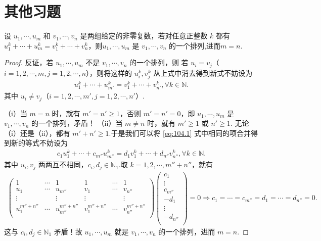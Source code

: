 \documentclass[../../main.tex]{subfiles}%
\begin{document}
\section{其他习题}

\begin{lemma}\label{lemma:引理1564561}
设 $u_1,\cdots,u_m$ 和 $v_1,\cdots,v_n$ 是两组给定的非零复数，若对任意正整数 $k$ 都有 $u_1^k+\cdots+u_m^k=v_1^k+\cdots+v_n^k$，则$u_1,\cdots,u_m$ 是 $v_1,\cdots,v_n$ 的一个排列,进而$m=n$.
\end{lemma}
\begin{proof}
反证，若 $u_1,\cdots ,u_m$ 不是 $v_1,\cdots ,v_n$ 的一个排列，则
若 $u_i=v_j$（$i=1,2,\cdots ,m,j=1,2,\cdots ,n$），则将这样的 $u_{i}^{k},v_{j}^{k}$ 从上式中消去得到新式不妨设为
\begin{align}
u_{1}^{k}+\cdots +u_{m'}^{k}=v_{1}^{k}+\cdots +v_{n'}^{k},\forall k\in \mathbb{N} .\label{eq:104.1}
\end{align}
其中 $u_i\ne v_j$（$i=1,2,\cdots ,m',j=1,2,\cdots ,n'$）.

（i）当 $m=n$ 时，就有 $m' =n' \geqslant 1$，否则 $m' =n' =0$，即 $u_1,\cdots ,u_m$ 是 $v_1,\cdots ,v_n$ 的一个排列，矛盾！
（ii）当 $m\ne n$ 时，就有 $m' \geqslant 1$ 或 $n' \geqslant 1$.
无论（i）还是（ii），都有 $m' +n' \geqslant 1$.于是我们可以将 \eqref{eq:104.1} 式中相同的项合并得到新的等式不妨设为
\begin{align*}
c_1u_{1}^{k}+\cdots +c_{m''}u_{m''}^{k}=d_1v_{1}^{k}+\cdots +d_{n''}v_{n''}^{k},\forall k\in \mathbb{N} .
\end{align*}
其中 $u_i,v_j$ 两两互不相同，$c_i,d_j\in \mathbb{N} _1$.取 $k=1,2,\cdots ,m'' +n''$，就有
\begin{align*}
\begin{pmatrix}
1&		\cdots&		1&		1&		\cdots&		1\\
u_1&		\cdots&		u_{m''}&		v_1&		\cdots&		v_{n''}\\
\vdots&		&		\vdots&		\vdots&		&		\vdots\\
u_{1}^{m'' +n''}&		\cdots&		u_{m''}^{m'' +n''}&		v_{1}^{m'' +n''}&		\cdots&		v_{n''}^{m'' +n''}\\
\end{pmatrix} \begin{pmatrix}
c_1\\
\vdots\\
c_{m''}\\
-d_1\\
\vdots\\
-d_{n''}\\
\end{pmatrix} =0\Rightarrow c_1=\cdots =c_{m''}=d_1=\cdots =d_{n''}=0.
\end{align*}
这与 $c_i,d_j\in \mathbb{N} _1$ 矛盾！故 $u_1,\cdots ,u_m$ 就是 $v_1,\cdots ,v_n$ 的一个排列，进而 $m=n$.
\end{proof}
\end{document}
